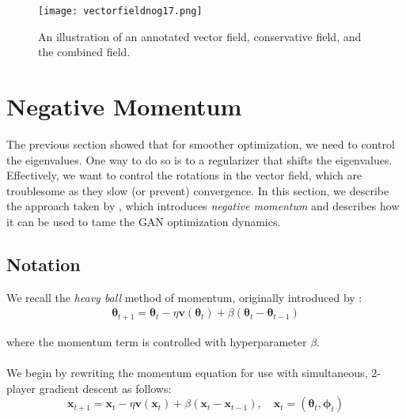 \documentclass{article}
\renewcommand{\vec}[1]{\ensuremath{\boldsymbol{#1}}}
\begin{document}
\begin{figure}[h!]
    \centering
    \texttt{[image: vectorfieldnog17.png]}
    \caption{An illustration of an annotated vector field, conservative field, and the combined field.}
    \label{fig:vfnog}
\end{figure}

\section{Negative Momentum}\label{sec:neg-mom}

The previous section showed that for smoother optimization, we need to control the eigenvalues. One way to do so is to a regularizer that shifts the eigenvalues. Effectively, we want to control the rotations in the vector field, which are troublesome as they slow (or prevent) convergence. In this section, we describe the approach taken by \citet{Gidel18NegMom}, which introduces \textit{negative momentum} and describes how it can be used to tame the GAN optimization dynamics.

\subsection{Notation}
We recall the \textit{heavy ball} method of momentum, originally introduced by \citet{POLYAK19641}:
\begin{align}
\vec{\theta}_{t+1} = \vec{\theta}_t - \eta\vec{v}(\vec{\theta}_t) + \beta(\vec{\theta}_t - \vec{\theta}_{t-1})
\end{align}

where the momentum term is controlled with hyperparameter $\beta$.
\\

\\

We begin by rewriting the momentum equation for use with simultaneous, 2-player gradient descent as follows:
$$\vec{x}_{t+1} = \vec{x}_t - \eta\vec{v}(\vec{x}_t) + \beta(\vec{x}_t - \vec{x}_{t-1}), \quad \vec{x}_t = (\vec{\theta}_t, \vec{\phi}_t)$$
\end{document}
